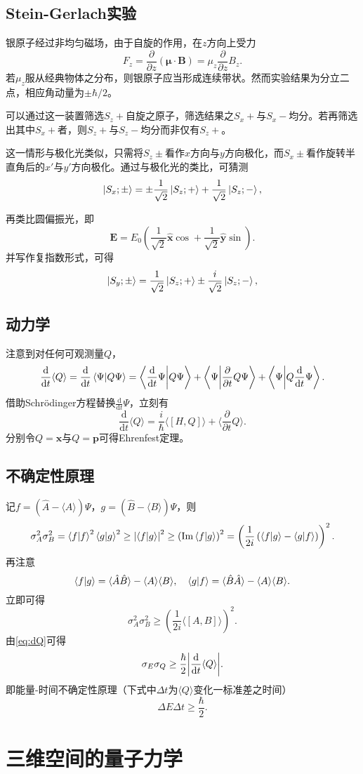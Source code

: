 \documentclass{ctexart}
\newcommand{\ddel}[1]{\frac{\partial}{\partial #1}}
\newcommand{\ddt}{\ddel{t}}
\newcommand{\edd}[1]{\frac{\mathrm{d}}{\mathrm{d} #1}}
\newcommand{\edt}{\edd{t}}
\newcommand{\pare}[1]{\left( #1 \right)}
\newcommand{\vect}[1]{\boldsymbol{#1}}
\newcommand{\alp}{\frac{1}{\sqrt{2}}}
\newcommand{\alpi}{\frac{i}{\sqrt{2}}}
\newcommand{\expc}[1]{\langle#1\rangle}
\newcommand{\bkn}[1]{\bra{#1}\ket{#1}}
\newcommand{\bk}[2]{\bra{#1}\ket{#2}}
\newcommand{\vari}[1]{\sigma_{#1}}
\newcommand{\intc}[2]{\left[#1, #2\right]}
\newcommand{\sch}{Schr\"{o}dinger}
\newcommand{\moment}{\boldsymbol{p}}
\newcommand{\coor}{\boldsymbol{x}}
\begin{document}
\subsection{Stein-Gerlach实验}
银原子经过非均匀磁场，由于自旋的作用，在$z$方向上受力
\[ F_z =  \ddel{z}\pare{\vect{\mu}\cdot\vect{B}} = \mu_z \ddel{z}B_z. \]
若$\mu_z$服从经典物体之分布，则银原子应当形成连续带状。然而实验结果为分立二点，相应角动量为$\pm \hbar /2$。
\par
可以通过这一装置筛选$S_z+$自旋之原子，筛选结果之$S_x+$与$S_x-$均分。若再筛选出其中$S_x+$者，则$S_z+$与$S_z-$均分而非仅有$S_z+$。
\par
这一情形与极化光类似，只需将$S_z\pm$看作$x$方向与$y$方向极化，而$S_x\pm$看作旋转半直角后的$x'$与$y'$方向极化。通过与极化光的类比，可猜测
\[ \ket{S_x;\pm} = \pm\alp\ket{S_z;+} + \alp\ket{S_z;-}, \]
\par
再类比圆偏振光，即
\[ \vect{E} = E_0\pare{\alp \hat{\vect{x}} \cos + \alp \hat{\vect{y}} \sin}. \]
并写作复指数形式，可得
\[ \ket{S_y;\pm} = \alp\ket{S_z;+} \pm  \alpi\ket{S_z;-}, \]
\subsection{动力学}
注意到对任何可观测量$Q$，
\[ \edt\expc{Q} = \edt\bk{\Psi}{Q\Psi} = \bk{\edt\Psi}{Q\Psi} + \bk{\Psi}{\ddt{Q}\Psi} + \bk{\Psi}{Q\edt\Psi}. \]
借助\sch 方程替换$\edt\Psi$，立刻有
\begin{equation}
\label{eq:dQ}
\edt\expc{Q} = \frac{i}{\hbar}\expc{\intc{H}{Q}} + \expc{\ddt{Q}}.
\end{equation}
分别令$Q=\coor$与$Q=\moment$可得Ehrenfest定理。
\subsection{不确定性原理}
记$f=\pare{\hat{A} - \expc{A}}\Psi$，$g=\pare{\hat{B} - \expc{B}}\Psi$，则
\[ \vari{A}^2\vari{B}^2 = \bkn{f}^2\bkn{g}^2 \ge \abs{\bk{f}{g}}^2 \ge \pare{\Im\bk{f}{g}}^2 = \pare{\frac{1}{2i}\pare{\bk{f}{g}-\bk{g}{f}}}^2. \]
再注意
\[ \bk{f}{g} = \expc{\hat{A}\hat{B}} - \expc{A}\expc{B},\quad \bk{g}{f} = \expc{\hat{B}\hat{A}} - \expc{A}\expc{B}. \]
立即可得
\[ \vari{A}^2\vari{B}^2 \ge \pare{\frac{1}{2i}\expc{\intc{A}{B}}}^2. \]
由\eqref{eq:dQ}可得
\[ \vari{E}\vari{Q} \ge \frac{\hbar}{2}\abs{\edt\expc{Q}}. \]
即能量-时间不确定性原理（下式中$\Delta t$为$\expc{Q}$变化一标准差之时间）
\[ \Delta E \Delta t \ge \frac{\hbar}{2}. \]
\section{三维空间的量子力学}
\end{document}
